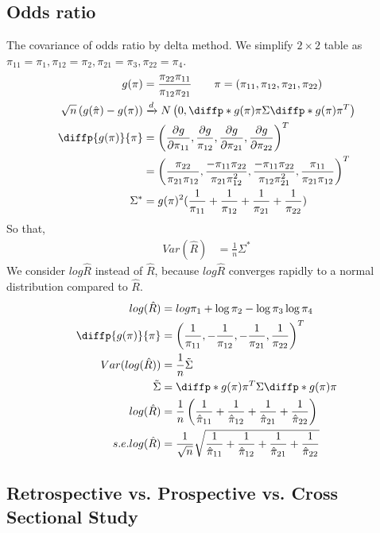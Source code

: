 \documentclass[11pt]{article} %
\begin{document}
\subsection{Odds ratio}
	The covariance of odds ratio by delta method. We simplify $2 \times 2$ table as $\pi_{11} = \pi_1, \pi_{12} = \pi_2, \pi_{21} = \pi_3, \pi_{22} = \pi_4$.
	\begin{align*}
		g(\pi) &= \frac{\pi_{22}\pi_{11}}{\pi_{12}\pi_{21}} \qquad \pi=(\pi_{11}, \pi_{12}, \pi_{21}, \pi_{22})\\
		\sqrt{n} \left( g(\hat{\pi}) - g({\pi}) \right) & \xrightarrow[]{d} N \left(0, \diffp*{g(\pi)}{\pi}{} \Sigma \diffp*{g(\pi)}{\pi}{}^T \right)\\
		\diffp{g(\pi)}{\pi}  &= \left( \frac{\partial g}{\partial \pi_{11}}, \frac{\partial g}{\pi_{12}}, \frac{\partial g}{\partial \pi_{21}}, \frac{\partial g}{\partial \pi_{22}} \right)^T\\
		& = \left( \frac{\pi_{22}}{\pi_{21}\pi_{12}}, \frac{-\pi_{11}\pi_{22}}{\pi_{21}\pi_{12}^2}, \frac{-\pi_{11}\pi_{22}}{\pi_{12}\pi_{21}^2}, \frac{\pi_{11}}{\pi_{21}\pi_{12}} \right)^T\\
		\Sigma^{\ast} &= g(\pi)^2(\frac{1}{\pi_{11}} + \frac{1}{\pi_{12}} + \frac{1}{\pi_{21}} + \frac{1}{\pi_{22}})
	\end{align*} 
	So that,
	\begin{align*}
		Var(\hat R) &=  \frac{1}{n} \Sigma^{\ast} 
	\end{align*} 
	We consider $log \hat R$ instead of $\hat R$, because $log \hat R$ converges rapidly to a normal distribution compared to $\hat R$.
	\begin{align*}
		log(\hat{R}) &= log \pi_1 + \log \pi_2 - \log \pi_3  \log \pi_4\\
		\diffp{g(\pi)}{\pi}  &= \left(\frac{1}{\pi_{11}} , -\frac{1}{\pi_{12}}, -\frac{1}{\pi_{21}}, \frac{1}{\pi_{22}} \right)^T\\
		Var(log(\hat{R})) &= \frac{1}{n} \Tilde{\Sigma} \\
		\Tilde{\Sigma} &= \diffp*{g(\pi)}{\pi}{}^T \Sigma \diffp*{g(\pi)}{\pi}{}\\
		log(\hat R) &=  \frac{1}{n}\left( \frac{1}{\hat \pi_{11}} + \frac{1}{\hat \pi_{12}} + \frac{1}{\hat \pi_{21}} + \frac{1}{\hat \pi_{22}} \right)\\
		s.e. log(\hat R) &=  \frac{1}{\sqrt{n}} \sqrt{\frac{1}{\hat \pi_{11}} + \frac{1}{\hat \pi_{12}} + \frac{1}{\hat \pi_{21}} + \frac{1}{\hat \pi_{22}}} 
	\end{align*} 
\subsection{Retrospective vs. Prospective vs. Cross Sectional Study}
\end{document}
